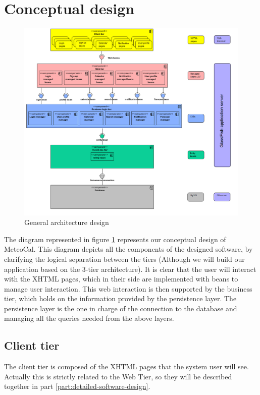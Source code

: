 \documentclass[10pt,a4paper,titlepage]{article}
\begin{document}
\section{Conceptual design}
\label{sec:conceptual-design}
\begin{figure}[htp]
\centering
\includegraphics[width=\linewidth]{./images/general_architecture_design}
\caption[General architecture]{General architecture design}
\label{fig:general-architecture}
\end{figure}

The diagram represented in figure \ref{fig:general-architecture} represents our conceptual design of MeteoCal. This diagram depicts all the components of the designed software, by clarifying the logical separation between the tiers (Although we will build our application based on the 3-tier architecture).
It is clear that the user will interact with the XHTML pages, which in their side are implemented with beans to manage user interaction. This web interaction is then supported by the business tier, which holds on the information provided by the persistence layer. The persistence layer is the one in charge of the connection to the database and managing all the queries needed from the above layers.

\subsection{Client tier}
The client tier is composed of the XHTML pages that the system user will see. Actually this is strictly related to the Web Tier, so they will be described together in part \ref{part:detailed-software-design}.
\end{document}
